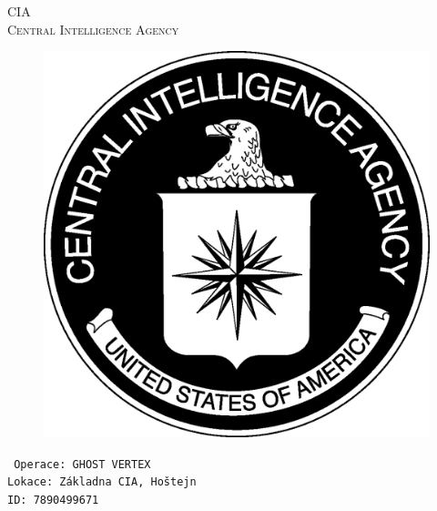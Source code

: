\documentclass[a4paper, \fontheight]{article}
\begin{document}
	\begin{titlepage}
		\begin{center}		
			\textsc{{\fontsize{80}{0}\selectfont CIA}\\[2em]
				\Huge Central Intelligence Agency\\[2.5em]}
				
			\begin{figure}[H]
				\centering
				\includegraphics[scale=0.6]{sources/CIA_logo.eps}
			\end{figure}
		\end{center}	
		\vfill
		\noindent
		\texttt{\LARGE
				Operace: GHOST VERTEX\\[0.4em]
				Lokace: Základna CIA, Hoštejn\\[0.4em]
				ID: 7890499671}	
\end{titlepage} 
\end{document}
